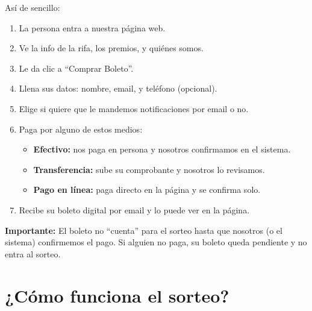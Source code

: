 \documentclass[12pt,a4paper]{article}
\begin{document}
Así de sencillo:

\begin{enumerate}[leftmargin=2em]
    \item La persona entra a nuestra página web.
    \item Ve la info de la rifa, los premios, y quiénes somos.
    \item Le da clic a ``Comprar Boleto''.
    \item Llena sus datos: nombre, email, y teléfono (opcional).
    \item Elige si quiere que le mandemos notificaciones por email o no.
    \item Paga por alguno de estos medios:
    \begin{itemize}
        \item \textbf{Efectivo:} nos paga en persona y nosotros confirmamos en el sistema.
        \item \textbf{Transferencia:} sube su comprobante y nosotros lo revisamos.
        \item \textbf{Pago en línea:} paga directo en la página y se confirma solo.
    \end{itemize}
    \item Recibe su boleto digital por email y lo puede ver en la página.
\end{enumerate}

\textbf{Importante:} El boleto no ``cuenta'' para el sorteo hasta que nosotros (o el sistema) confirmemos el pago. Si alguien no paga, su boleto queda pendiente y no entra al sorteo.

\section{¿Cómo funciona el sorteo?}
\end{document}
